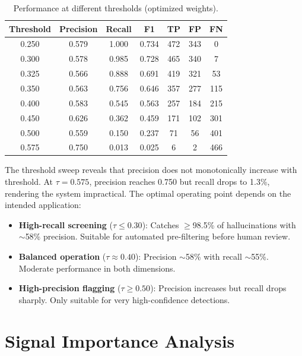 \begin{table}[!htbp]
    \centering
    \caption{Performance at different thresholds (optimized weights).}
    \label{tab:threshold_sweep}
    \begin{tabular}{ccccccc}
        \toprule
        Threshold & Precision & Recall & F1 & TP & FP & FN \\
        \midrule
        0.250 & 0.579 & 1.000 & 0.734 & 472 & 343 & 0 \\
        0.300 & 0.578 & 0.985 & 0.728 & 465 & 340 & 7 \\
        0.325 & 0.566 & 0.888 & 0.691 & 419 & 321 & 53 \\
        0.350 & 0.563 & 0.756 & 0.646 & 357 & 277 & 115 \\
        0.400 & 0.583 & 0.545 & 0.563 & 257 & 184 & 215 \\
        0.450 & 0.626 & 0.362 & 0.459 & 171 & 102 & 301 \\
        0.500 & 0.559 & 0.150 & 0.237 & 71 & 56 & 401 \\
        0.575 & 0.750 & 0.013 & 0.025 & 6 & 2 & 466 \\
        \bottomrule
    \end{tabular}
\end{table}

The threshold sweep reveals that precision does not monotonically increase with threshold. At $\tau = 0.575$, precision reaches 0.750 but recall drops to 1.3\%, rendering the system impractical. The optimal operating point depends on the intended application:

\begin{itemize}
    \item \textbf{High-recall screening} ($\tau \leq 0.30$): Catches $\geq$98.5\% of hallucinations with $\sim$58\% precision. Suitable for automated pre-filtering before human review.
    \item \textbf{Balanced operation} ($\tau \approx 0.40$): Precision $\sim$58\% with recall $\sim$55\%. Moderate performance in both dimensions.
    \item \textbf{High-precision flagging} ($\tau \geq 0.50$): Precision increases but recall drops sharply. Only suitable for very high-confidence detections.
\end{itemize}

\section{Signal Importance Analysis}


